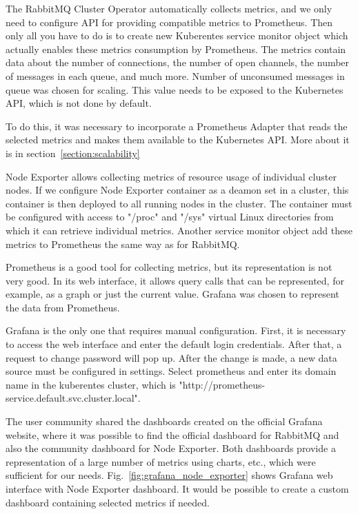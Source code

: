 The RabbitMQ Cluster Operator automatically collects metrics, and we only need to configure API for providing compatible metrics to Prometheus. Then only all you have to do is to create new Kuberentes service monitor object which actually enables these metrics consumption by Prometheus. The metrics contain data about the number of connections, the number of open channels, the number of messages in each queue, and much more. Number of unconsumed messages in queue was chosen for scaling. This value needs to be exposed to the Kubernetes API, which is not done by default.

To do this, it was necessary to incorporate a Prometheus Adapter that reads the selected metrics and makes them available to the Kubernetes API. More about it is in section~\ref{section:scalability} 

Node Exporter allows collecting metrics of resource usage of individual cluster nodes. If we configure Node Exporter container as a deamon set in a cluster, this container is then deployed to all running nodes in the cluster. The container must be configured with access to "/proc" and "/sys" virtual Linux directories from which it can retrieve individual metrics. Another service monitor object add these metrics to Prometheus the same way as for RabbitMQ.

Prometheus is a good tool for collecting metrics, but its representation is not very good. In its web interface, it allows query calls that can be represented, for example, as a graph or just the current value. Grafana was chosen to represent the data from Prometheus. 

Grafana is the only one that requires manual configuration. First, it is necessary to access the web interface and enter the default login credentials. After that, a request to change password will pop up. After the change is made, a new data source must be configured in settings. Select prometheus and enter its domain name in the kuberentes cluster, which is "http://prometheus-service.default.svc.cluster.local".

The user community shared the dashboards created on the official Grafana website, where it was possible to find the official dashboard for RabbitMQ and also the community dashboard for Node Exporter. Both dashboards provide a representation of a large number of metrics using charts, etc., which were sufficient for our needs. Fig.~\ref{fig:grafana_node_exporter} shows Grafana web interface with Node Exporter dashboard. It would be possible to create a custom dashboard containing selected metrics if needed.

